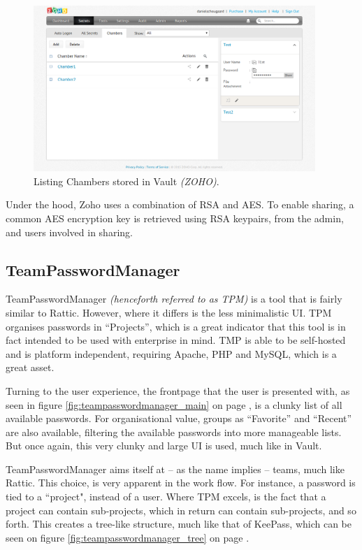 			\begin{figure}[htbp]
				\centering
				\includegraphics[width=0.95\textwidth]{figures/analysis/vaultzoho_main_chambers.png}
				\caption{Listing Chambers stored in Vault \emph{(ZOHO)}.}
				\label{fig:vaultzoho_main_chambers}
			\end{figure}


			Under the hood, Zoho uses a combination of RSA and AES. To enable sharing, a common AES encryption key is retrieved using RSA keypairs, from the admin, and users involved in sharing\cite{vault_zoho_encryption}.

		\subsection*{TeamPasswordManager}
			TeamPasswordManager\cite{teampasswordmanager_frontpage} \emph{(henceforth referred to as TPM)} is a tool that is fairly similar to Rattic. However, where it differs is the less minimalistic UI. TPM organises passwords in ``Projects'', which is a great indicator that this tool is in fact intended to be used with enterprise in mind. TMP is able to be self-hosted and is platform independent, requiring Apache, PHP and MySQL, which is a great asset.

			Turning to the user experience, the frontpage that the user is presented with, as seen in figure \ref{fig:teampasswordmanager_main} on page \pageref{fig:teampasswordmanager_main}, is a clunky list of all available passwords. For organisational value, groups as ``Favorite'' and ``Recent'' are also available, filtering the available passwords into more manageable lists. But once again, this very clunky and large UI is used, much like in Vault.

			TeamPasswordManager aims itself at -- as the name implies -- teams, much like Rattic. This choice, is very apparent in the work flow. For instance, a password is tied to a ``project", instead of a user. Where TPM excels, is the fact that a project can contain sub-projects, which in return can contain sub-projects, and so forth. This creates a tree-like structure, much like that of KeePass, which can be seen on figure \ref{fig:teampasswordmanager_tree} on page \pageref{fig:teampasswordmanager_tree}.


